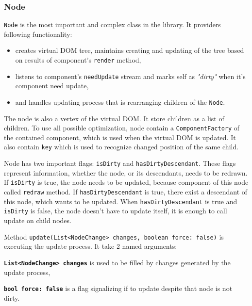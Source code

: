 \documentclass[oneside, 12pt]{book}
\begin{document}
    \subsubsection{Node}\label{subsubsec:our-architecture-core-node}
      \texttt{Node} is the most important and complex class in the library.
      It providers following functionality:
      \begin{itemize}
        \item creates virtual DOM tree, maintains creating and updating of the tree based on results of component's \texttt{render} method, 
        \item listens to component's \texttt{needUpdate} stream and marks self as \textit{"dirty"} when it's component need update,
        \item and handles updating process that is rearranging children of the \texttt{Node}.
      \end{itemize}

      The node is also a vertex of the virtual DOM. 
      It store children as a list of children. 
      To use all possible optimization, node contain a \texttt{ComponentFactory} of the contained component, which is used when the virtual DOM is updated.
      It also contain \texttt{key} which is used to recognize changed position of the same child.

      Node has two important flags: \texttt{isDirty} and \texttt{hasDirtyDescendant}. 
      These flags represent information, whether the node, or its descendants, needs to be redrawn.
      If \texttt{isDirty} is true, the node needs to be updated, 
      because component of this node called \texttt{redraw} method.
      If \texttt{hasDirtyDescendant} is true,  
      there exist a descendant of this node, which wants to be updated.
      When \texttt{hasDirtyDescendant} is true and \texttt{isDirty} is false, 
      the node doesn't have to update itself, it is enough to call update on child nodes.

      Method \texttt{update({List<NodeChange> changes, boolean force: false})} is executing the update process. 
      It take 2 named arguments:
      \begin{description}
        \item{\textbf{\texttt{List<NodeChange> changes}}} is used to be filled by changes generated by the update process,
        \item{\textbf{\texttt{bool force: false}}} is a flag signalizing if to update despite that node is not dirty.
      \end{description}
\end{document}

